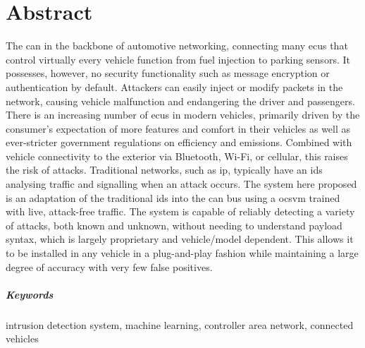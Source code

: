 \chapter*{Abstract}


The \gls{can} in the backbone of automotive networking, connecting many \glspl{ecu} that control virtually every vehicle function from fuel injection to parking sensors. It possesses, however, no security functionality such as message encryption or authentication by default. Attackers can easily inject or modify packets in the network, causing vehicle malfunction and endangering the driver and passengers. There is an increasing number of \glspl{ecu} in modern vehicles, primarily driven by the consumer's expectation of more features and comfort in their vehicles as well as ever-stricter government regulations on efficiency and emissions. Combined with vehicle connectivity to the exterior via Bluetooth, Wi-Fi, or cellular, this raises the risk of attacks. Traditional networks, such as \gls{ip}, typically have an \gls{ids} analysing traffic and signalling when an attack occurs. The system here proposed is an adaptation of the traditional \gls{ids} into the \gls{can} bus using a \gls{ocsvm} trained with live, attack-free traffic. The system is capable of reliably detecting a variety of attacks, both known and unknown, without needing to understand payload syntax, which is largely proprietary and vehicle/model dependent. This allows it to be installed in any vehicle in a plug-and-play fashion while maintaining a large degree of accuracy with very few false positives.

\paragraph{Keywords} intrusion detection system, machine learning, controller area network, connected vehicles